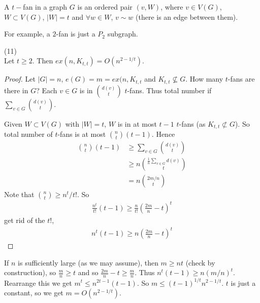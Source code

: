 \documentclass[a4paper]{article}
\begin{document}
\begin{defi}
A $t-$fan in a graph $G$ is an ordered pair $(v,W)$, where $v \in V(G)$, $W \subset V(G)$, $|W| = t$ and $\forall w \in W$, $v \sim w$ (there is an edge between them).
\end{defi}

For example, a $2$-fan is just a $P_2$ subgraph.

\begin{thm} (11)\\
Let $t \geq 2$. Then $ex(n,K_{t,t}) = O(n^{2-1/t})$.
\begin{proof}
Let $|G| = n$, $e(G) = m = ex(n,K_{t,t}$ and $K_{t,t} \not \subseteq G$. How many $t$-fans are there in $G$? Each $v \in G$ is in ${d(v) \choose t}$ $t$-fans. Thus total number if $\sum_{v \in G} {d(v) \choose t}$.

Given $W \subset V(G)$ with $|W| = t$, $W$ is in at most $t-1$ $t$-fans (as $K_{t,t} \not\subset G$). So total number of $t$-fans is at most ${n \choose t} (t-1)$. Hence 
\begin{equation*}
\begin{aligned}
{n \choose t}(t-1) &\geq \sum_{v \in G} {d(v) \choose t}\\
&\geq n {\frac{1}{n}\sum_{v \in G} d(v) \choose t}\\
&= n{2m/n \choose t}
\end{aligned}
\end{equation*}
Note that ${n \choose t} \geq n^t/t!$. So
\begin{equation*}
\begin{aligned}
\frac{n^t}{t!} (t-1) \geq \frac{n}{t!}\left(\frac{2m}{n}-t\right)^t
\end{aligned}
\end{equation*}
get rid of the $t!$,
\begin{equation*}
\begin{aligned}
n^t (t-1) \geq n\left(\frac{2m}{n}-t\right)^t
\end{aligned}
\end{equation*}
\end{proof}
\end{thm}

If $n$ is sufficiently large (as we may assume), then $m \geq nt$ (check by construction), so $\frac{m}{n} \geq t$ and so $\frac{2m}{n}-t\geq \frac{m}{n}$. Thus $n^t(t-1) \geq n(m/n)^t$. Rearrange this we get $m^t \leq n^{2t-1}(t-1)$. So $m \leq (t-1)^{1/t} n^{2-1/t}$. $t$ is just a constant, so we get $m = O(n^{2-1/t})$.
\end{document}
